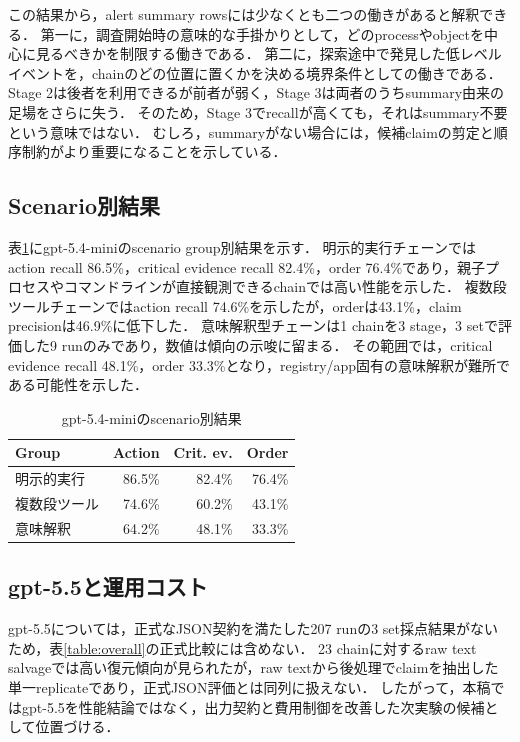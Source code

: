\documentclass[dvipdfmx]{FITpaper}
\newcommand{\model}[1]{\mbox{\textrm{#1}}}
\begin{document}
この結果から，alert summary rowsには少なくとも二つの働きがあると解釈できる．
第一に，調査開始時の意味的な手掛かりとして，どのprocessやobjectを中心に見るべきかを制限する働きである．
第二に，探索途中で発見した低レベルイベントを，chainのどの位置に置くかを決める境界条件としての働きである．
Stage 2は後者を利用できるが前者が弱く，Stage 3は両者のうちsummary由来の足場をさらに失う．
そのため，Stage 3でrecallが高くても，それはsummary不要という意味ではない．
むしろ，summaryがない場合には，候補claimの剪定と順序制約がより重要になることを示している．

\subsection{Scenario別結果}

表\ref{table:scenario}に\model{gpt-5.4-mini}のscenario group別結果を示す．
明示的実行チェーンではaction recall 86.5\%，critical evidence recall 82.4\%，order 76.4\%であり，親子プロセスやコマンドラインが直接観測できるchainでは高い性能を示した．
複数段ツールチェーンではaction recall 74.6\%を示したが，orderは43.1\%，claim precisionは46.9\%に低下した．
意味解釈型チェーンは1 chainを3 stage，3 setで評価した9 runのみであり，数値は傾向の示唆に留まる．
その範囲では，critical evidence recall 48.1\%，order 33.3\%となり，registry/app固有の意味解釈が難所である可能性を示した．

\begin{table}[ht]
    \centering
    \caption{\model{gpt-5.4-mini}のscenario別結果}
    \label{table:scenario}
    \begin{tabular}{lrrr}
        \toprule
        Group & Action & Crit. ev. & Order \\
        \midrule
        明示的実行 & 86.5\% & 82.4\% & 76.4\% \\
        複数段ツール & 74.6\% & 60.2\% & 43.1\% \\
        意味解釈 & 64.2\% & 48.1\% & 33.3\% \\
        \bottomrule
    \end{tabular}
\end{table}

\subsection{gpt-5.5と運用コスト}

\model{gpt-5.5}については，正式なJSON契約を満たした207 runの3 set採点結果がないため，表\ref{table:overall}の正式比較には含めない．
23 chainに対するraw text salvageでは高い復元傾向が見られたが，raw textから後処理でclaimを抽出した単一replicateであり，正式JSON評価とは同列に扱えない．
したがって，本稿では\model{gpt-5.5}を性能結論ではなく，出力契約と費用制御を改善した次実験の候補として位置づける．
\end{document}
